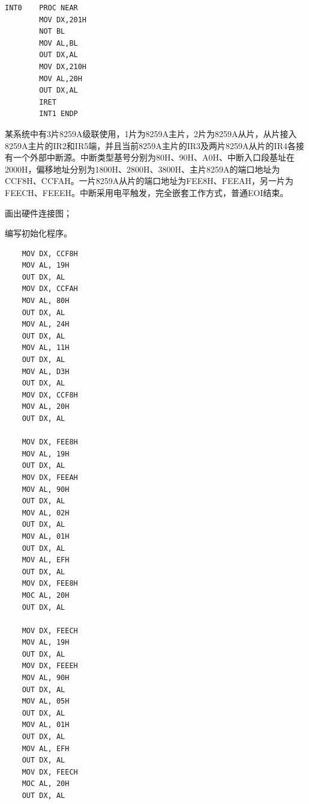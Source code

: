 \documentclass{ctexart}
\begin{document}
\begin{outline}[enumerate]
\begin{verbatim}
INT0    PROC NEAR 
        MOV DX,201H
        NOT BL
        MOV AL,BL
        OUT DX,AL
        MOV DX,210H
        MOV AL,20H
        OUT DX,AL
        IRET
        INT1 ENDP
\end{verbatim}
\1 某系统中有3片8259A级联使用，1片为8259A主片，2片为8259A从片，从片接入8259A主片的IR2和IR5端，并且当前8259A主片的IR3及两片8259A从片的IR4各接有一个外部中断源。中断类型基号分别为80H、90H、A0H、中断入口段基址在2000H，偏移地址分别为1800H、2800H、3800H、主片8259A的端口地址为CCF8H、CCFAH。一片8259A从片的端口地址为FEE8H、FEEAH，另一片为FEECH、FEEEH。中断采用电平触发，完全嵌套工作方式，普通EOI结束。

\2 画出硬件连接图；

\2 编写初始化程序。
\begin{verbatim}
    MOV DX, CCF8H
    MOV AL, 19H
    OUT DX, AL
    MOV DX, CCFAH
    MOV AL, 80H
    OUT DX, AL
    MOV AL, 24H
    OUT DX, AL
    MOV AL, 11H
    OUT DX, AL
    MOV AL, D3H
    OUT DX, AL
    MOV DX, CCF8H
    MOV AL, 20H
    OUT DX, AL

    MOV DX, FEE8H
    MOV AL, 19H
    OUT DX, AL
    MOV DX, FEEAH
    MOV AL, 90H
    OUT DX, AL
    MOV AL, 02H
    OUT DX, AL
    MOV AL, 01H
    OUT DX, AL
    MOV AL, EFH
    OUT DX, AL
    MOV DX, FEE8H
    MOC AL, 20H
    OUT DX, AL

    MOV DX, FEECH
    MOV AL, 19H
    OUT DX, AL
    MOV DX, FEEEH
    MOV AL, 90H
    OUT DX, AL
    MOV AL, 05H
    OUT DX, AL
    MOV AL, 01H
    OUT DX, AL
    MOV AL, EFH
    OUT DX, AL
    MOV DX, FEECH
    MOC AL, 20H
    OUT DX, AL



\end{verbatim}

\end{outline}
\end{document}

